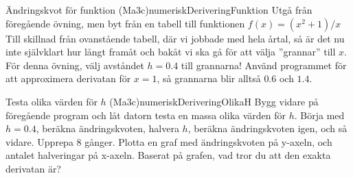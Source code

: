 \begin{matteovning}{Ändringskvot för funktion (Ma3c)}{numeriskDeriveringFunktion}
Utgå från föregående övning, men byt från en tabell till funktionen $f(x) = (x^2 + 1) / x$
\newline
\newline
Till skillnad från ovanstående tabell, där vi jobbade med hela årtal, så är det nu inte självklart hur långt framåt och bakåt vi ska gå för att välja ''grannar'' till $x$. För denna övning, välj avståndet $h=0.4$ till grannarna! Använd programmet för att approximera derivatan för $x=1$, så grannarna blir alltså $0.6$ och $1.4$.
\end{matteovning}

\begin{matteovningm}{Testa olika värden för $h$ (Ma3c)}{numeriskDeriveringOlikaH}
Bygg vidare på föregående program och låt datorn testa en massa olika värden för $h$. Börja med $h=0.4$, beräkna ändringskvoten, halvera $h$, beräkna ändringskvoten igen, och så vidare. Upprepa 8 gånger. Plotta en graf med ändringskvoten på y-axeln, och antalet halveringar på x-axeln. Baserat på grafen, vad tror du att den exakta derivatan är?
\end{matteovningm}


